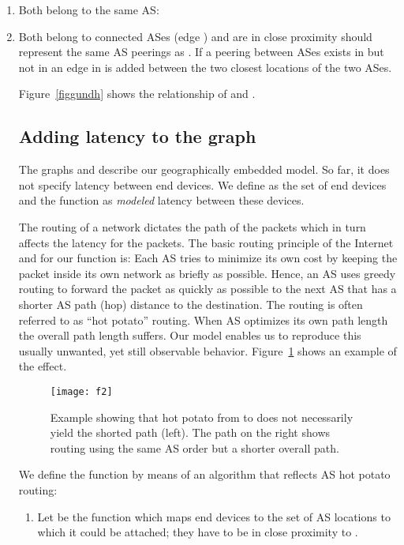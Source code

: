 \documentclass{sig-alternate-10pt}
\begin{document}
\begin{enumerate}
\item\label{con1} Both belong to the same AS: 
\item\label{con2} Both belong to connected ASes (edge  ) 
 and are in close proximity 
 should represent the same AS peerings as . If a peering between ASes exists in   but not in  an edge in  is added between the two closest locations of the two ASes.


Figure~\ref{figgundh} shows the relationship  of  and
. 
\subsection{Adding latency to the graph}
\label{sec:adding-latency-graph}

The graphs  and  describe our geographically embedded model. So far, it does not specify latency between end devices.  We define  as the set of end devices and the function  as \emph{modeled} latency between these devices.

The routing of a network dictates the path of the packets which in turn affects the latency for the packets. The basic routing principle of the Internet and for our function  is:  Each AS tries to minimize its own cost by keeping the packet inside its own network as briefly as possible. Hence, an AS uses greedy routing to forward the packet as quickly as possible to the next AS that has a shorter AS path (hop) distance to the destination. The routing is often referred to as ``hot potato'' routing. When AS optimizes its own path length the overall path length suffers. Our model enables us to reproduce this usually unwanted, yet still observable behavior. Figure~\ref{greedyrouting} shows an example of the effect.

\begin{figure}
\texttt{[image: f2]}
\caption{Example showing that hot potato from  to  does not necessarily yield the shorted path (left). The path on the right shows routing using the same AS order but a shorter overall path. }\label{greedyrouting}
\end{figure}


We define the function  by means of an algorithm that reflects AS hot potato routing:\begin{enumerate}
\item \label{item:pick-candidate-locations} Let 
 be the function which maps end devices to the set of AS locations to which it could be attached; they have to be in close proximity to . 


\end{enumerate}
\end{enumerate}
\end{document}
